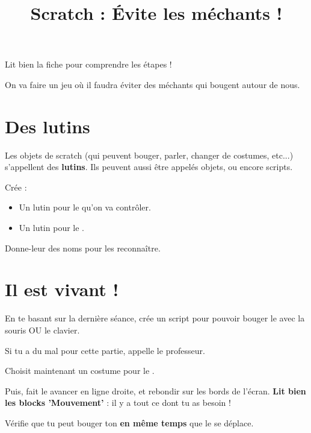 \documentclass[a4paper,11pt]{article}
\title{Scratch : Évite les méchants !}
\date{}
\author{}
\begin{document}
\maketitle

\begin{attention}[frametitle={\huge ⚠}]
	Lit bien la fiche pour comprendre les étapes !
\end{attention}

\begin{center}
	\large
	On va faire un jeu où il faudra éviter des méchants qui bougent autour de nous.
\end{center}

\section{Des lutins}

\begin{vocabulaire}[Lutins]
	Les objets de scratch (qui peuvent bouger, parler, changer de costumes, etc...) s'appellent des \textbf{lutins}. Ils peuvent aussi être appelés objets, ou encore scripts.
\end{vocabulaire}

Crée :
\begin{itemize}
	\item Un lutin pour le  qu'on va contrôler.
	\item Un lutin pour le .
\end{itemize}

Donne-leur des noms pour les reconnaître.

\section{Il est vivant !}

En te basant sur la dernière séance, crée un script pour pouvoir bouger le  avec la souris OU le clavier.

\begin{attention}
	Si tu a du mal pour cette partie, appelle le professeur.
\end{attention}

Choisit maintenant un costume pour le .

Puis, fait le avancer en ligne droite, et rebondir sur les bords de l'écran. \textbf{Lit bien les blocks 'Mouvement'} : il y a tout ce dont tu as besoin !

\begin{attention}
	Vérifie que tu peut bouger ton  \textbf{en même temps} que le  se déplace.
\end{attention}
\end{document}

